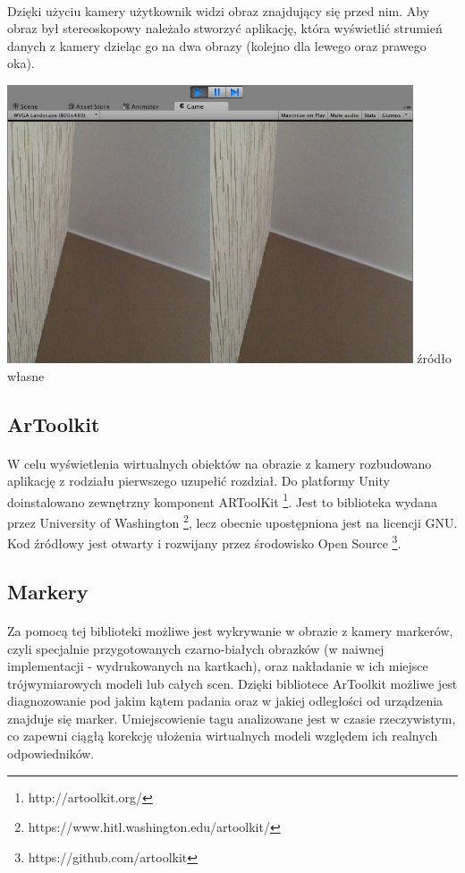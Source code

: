 \documentclass[12pt]{article}
\begin{document}
{\paragraph{}
Dzięki użyciu kamery użytkownik widzi obraz znajdujący się przed nim. Aby obraz był stereoskopowy należało stworzyć aplikację, która wyświetlić strumień danych z kamery dzieląc go na dwa obrazy (kolejno dla lewego oraz prawego oka).

\begin{center}
\includegraphics[width=0.9\textwidth]{images/kadr.jpg}
\small {źródło własne}
\end{center}

\subsection{ArToolkit}
\paragraph{}
W celu wyświetlenia wirtualnych obiektów na obrazie z kamery rozbudowano aplikację z rodziału pierwszego {\color{red}uzupełić rozdział}. Do platformy Unity doinstalowano zewnętrzny komponent ARToolKit  \footnote{http://artoolkit.org/}. Jest to biblioteka wydana przez University of Washington \footnote{https://www.hitl.washington.edu/artoolkit/}, lecz obecnie upostępniona jest na licencji GNU. Kod źródłowy jest otwarty i rozwijany przez środowisko Open Source \footnote{https://github.com/artoolkit}.
\subsection{Markery}
\paragraph{}
Za pomocą tej biblioteki możliwe jest wykrywanie w obrazie z kamery markerów, czyli specjalnie przygotowanych czarno-białych obrazków (w naiwnej implementacji - wydrukowanych na kartkach), oraz nakładanie w ich miejsce trójwymiarowych modeli lub całych scen. Dzięki bibliotece ArToolkit możliwe jest diagnozowanie pod jakim kątem padania oraz w jakiej odległości od urządzenia znajduje się marker. Umiejscowienie tagu analizowane jest w czasie rzeczywistym, co zapewni ciągłą korekcję ułożenia wirtualnych modeli względem ich realnych odpowiedników.

}
\end{document}
